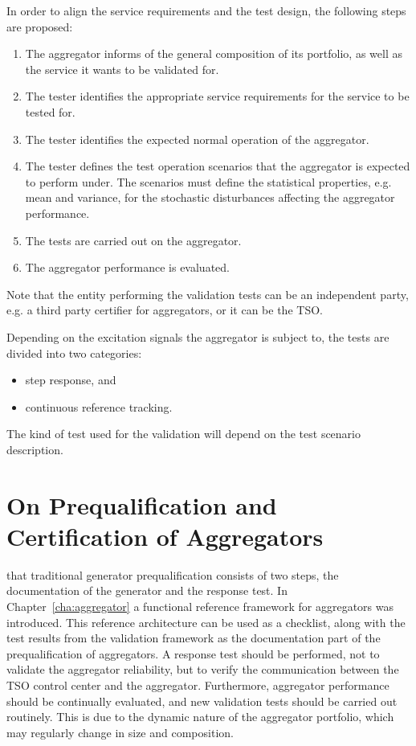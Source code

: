 In order to align the service requirements and the test design, the following steps are proposed:
\begin{enumerate}
	\item The aggregator informs of the general composition of its portfolio, as well as the service it wants to be validated for.
	\item The tester identifies the appropriate service requirements for the service to be tested for.
	\item The tester identifies the expected normal operation of the aggregator.
	\item The tester defines the test operation scenarios that the aggregator is expected to perform under. The scenarios must define the statistical properties, e.g. mean and variance, for the stochastic disturbances affecting the aggregator performance.
	\item The tests are carried out on the aggregator.
	\item The aggregator performance is evaluated.	
\end{enumerate}

Note that the entity performing the validation tests can be an independent party, e.g. a third party certifier for aggregators, or it can be the TSO.

Depending on the excitation signals the aggregator is subject to, the tests are divided into two categories:
\begin{itemize}
	\item step response, and
	\item continuous reference tracking.
\end{itemize}
The kind of test used for the validation will depend on the test scenario description.

\section{On Prequalification and Certification of Aggregators}\label{sec:aggpreq}
 that traditional generator prequalification consists of two steps, the documentation of the generator and the response test. In Chapter~\ref{cha:aggregator} a functional reference framework for aggregators was introduced. This reference architecture can be used as a checklist, along with the test results from the validation framework as the documentation part of the prequalification of aggregators. A response test should be performed, not to validate the aggregator reliability, but to verify the communication between the TSO control center and the aggregator. Furthermore, aggregator performance should be continually evaluated, and new validation tests should be carried out routinely. This is due to the dynamic nature of the aggregator portfolio, which may regularly change in size and composition.

